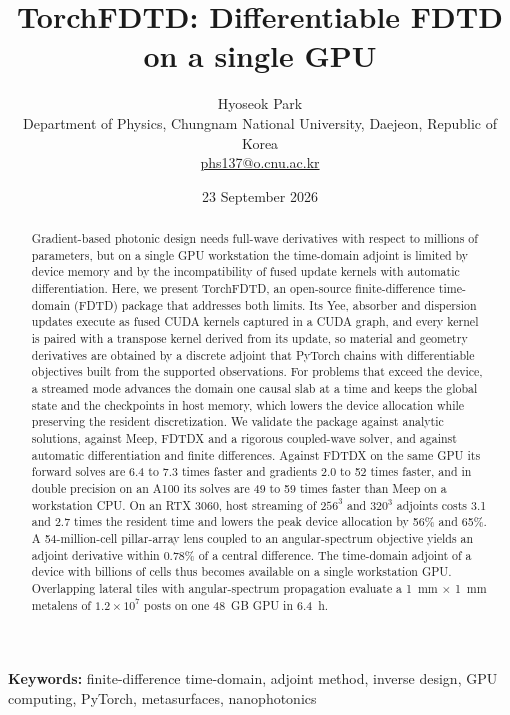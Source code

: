 \documentclass[11pt,a4paper]{article}
\title{\Large\bfseries TorchFDTD: Differentiable FDTD on a single GPU}
\author{Hyoseok Park\\[2pt]\small Department of Physics, Chungnam National University, Daejeon, Republic of Korea\\[2pt]\small\href{mailto:phs137@o.cnu.ac.kr}{phs137@o.cnu.ac.kr}}
\date{\small 23 September 2026}
\begin{document}
\maketitle

\begin{abstract}
Gradient-based photonic design needs full-wave derivatives with respect to millions of parameters, but on a single GPU workstation the time-domain adjoint is limited by device memory and by the incompatibility of fused update kernels with automatic differentiation. Here, we present TorchFDTD, an open-source finite-difference time-domain (FDTD) package that addresses both limits. Its Yee, absorber and dispersion updates execute as fused CUDA kernels captured in a CUDA graph, and every kernel is paired with a transpose kernel derived from its update, so material and geometry derivatives are obtained by a discrete adjoint that PyTorch chains with differentiable objectives built from the supported observations. For problems that exceed the device, a streamed mode advances the domain one causal slab at a time and keeps the global state and the checkpoints in host memory, which lowers the device allocation while preserving the resident discretization. We validate the package against analytic solutions, against Meep, FDTDX and a rigorous coupled-wave solver, and against automatic differentiation and finite differences. Against FDTDX on the same GPU its forward solves are 6.4 to 7.3 times faster and gradients 2.0 to 52 times faster, and in double precision on an A100 its solves are 49 to 59 times faster than Meep on a workstation CPU. On an RTX 3060, host streaming of $256^3$ and $320^3$ adjoints costs 3.1 and 2.7 times the resident time and lowers the peak device allocation by 56\% and 65\%. A 54-million-cell pillar-array lens coupled to an angular-spectrum objective yields an adjoint derivative within 0.78\% of a central difference. The time-domain adjoint of a device with billions of cells thus becomes available on a single workstation GPU. Overlapping lateral tiles with angular-spectrum propagation evaluate a 1~mm $\times$ 1~mm metalens of $1.2\times10^{7}$ posts on one 48~GB GPU in 6.4~h.
\end{abstract}

\noindent\textbf{Keywords:} finite-difference time-domain, adjoint method, inverse design, GPU computing, PyTorch, metasurfaces, nanophotonics
\end{document}
